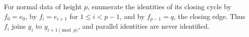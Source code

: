 \begin{definition}
For normal data of height $p$, enumerate the identities of its closing
cycle by $f_0=e_0$, by $f_i=e_{i+1}$ for $1\le i<p-1$, and by
$f_{p-1}=q$, the closing edge.  Thus $f_i$ joins $y_i$ to
$y_{i+1\pmod p}$, and parallel identities are never identified.
\end{definition}
